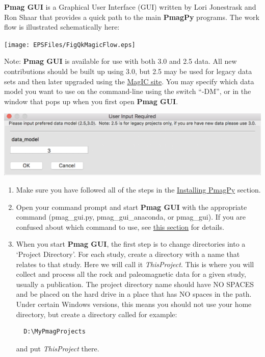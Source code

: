 \documentclass[11pt]{book}
\begin{document}
{{{\bf Pmag GUI} is a Graphical User Interface (GUI) written by Lori Jonestrask and Ron Shaar  that provides a quick path to the main {\bf PmagPy} programs. The work flow is illustrated schematically here:

\texttt{[image: EPSFiles/FigQkMagicFlow.eps]}

Note: {\bf Pmag GUI} is available for use with both 3.0 and 2.5 data.  All new contributions should be built up using 3.0, but 2.5 may be used for legacy data sets and then later upgraded using the \href{https://www.earthref.org/MagIC/upgrade}{MagIC site}.  You may specify which data model you want to use on the command-line using the switch ``-DM'', or in the window that pops up when you first open {\bf Pmag GUI}.

\includegraphics[width=6in]{EPSFiles/PmagGUI_choose_data_model.eps}

\begin{enumerate}
\item Make sure you have followed all of the steps in the \href{#quick_start}{Installing PmagPy} section.


\item Open your command prompt and start {\bf Pmag GUI} with the appropriate command (pmag\_gui.py, pmag\_gui\_anaconda, or pmag\_gui).  If you are confused about which command to use, see \href{#which_command}{this section} for details.

\item  When you start {\bf Pmag GUI}, the first step is to change directories into a  `Project Directory'. For each study, create a directory with a name that relates to that study. Here we will call it {\it ThisProject}.  This is where you will collect and process all the rock and paleomagnetic data for a given study, usually a publication. The project directory name should have NO SPACES and be placed on the hard drive in a place that has NO spaces in the path. Under certain Windows versions, this means you should not use your home directory, but create a directory called for example:\begin{verbatim}
  D:\MyPmagProjects\end{verbatim} and put {\it ThisProject} there.
%
%
%



\end{enumerate}}}
\end{document}
